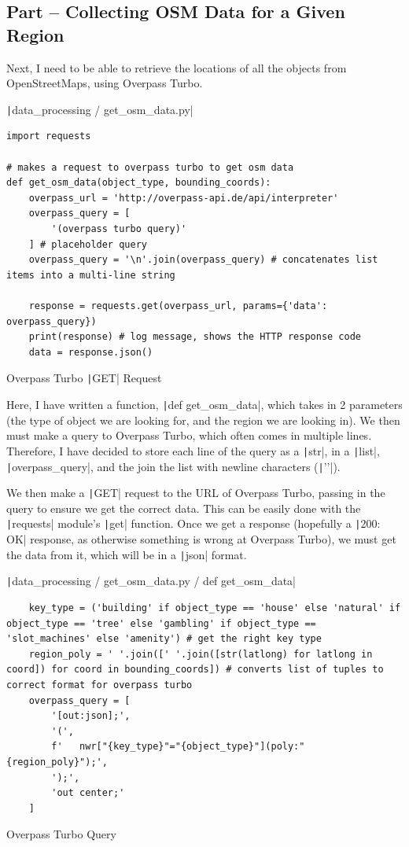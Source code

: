 \documentclass[12pt]{report}
\newcommand{\pil}[1]{\protect\texttt|#1|}
\begin{document}
\subsection{Part \theparts{} -- Collecting OSM Data for a Given Region}\label{sec:get_osm_data}
Next, I need to be able to retrieve the locations of all the objects from OpenStreetMaps, using Overpass Turbo.

\begin{listing}[H]
\pil{data_processing / get_osm_data.py}
\begin{verbatim}
import requests

# makes a request to overpass turbo to get osm data
def get_osm_data(object_type, bounding_coords):
    overpass_url = 'http://overpass-api.de/api/interpreter'
    overpass_query = [
        '(overpass turbo query)'
    ] # placeholder query
    overpass_query = '\n'.join(overpass_query) # concatenates list items into a multi-line string

    response = requests.get(overpass_url, params={'data': overpass_query})
    print(response) # log message, shows the HTTP response code
    data = response.json()
\end{verbatim}
\caption{Overpass Turbo \pil{GET} Request}\label{cs:overpassRequest}
\end{listing}
Here, I have written a function, \pil{def get_osm_data}, which takes in 2 parameters (the type of object we are looking for, and the region we are looking in). We then must make a query to Overpass Turbo, which often comes in multiple lines. Therefore, I have decided to store each line of the query as a \pil{str}, in a \pil{list}, \pil{overpass_query}, and the join the list with newline characters (\texttt|'\n'|).

We then make a \pil{GET} request to the URL of Overpass Turbo, passing in the query to ensure we get the correct data. This can be easily done with the \pil{requests} module's \pil{get} function. Once we get a response (hopefully a \pil{200: OK} response, as otherwise something is wrong at Overpass Turbo), we must get the data from it, which will be in a \pil{json} format.

\begin{listing}[H]
\pil{data_processing / get_osm_data.py / def get_osm_data}
\begin{verbatim}
    key_type = ('building' if object_type == 'house' else 'natural' if object_type == 'tree' else 'gambling' if object_type == 'slot_machines' else 'amenity') # get the right key type
    region_poly = ' '.join([' '.join([str(latlong) for latlong in coord]) for coord in bounding_coords]) # converts list of tuples to correct format for overpass turbo
    overpass_query = [
        '[out:json];',
        '(',
        f'   nwr["{key_type}"="{object_type}"](poly:"{region_poly}");',
        ');',
        'out center;'
    ]
\end{verbatim}
\caption{Overpass Turbo Query}\label{cs:overpassQuery}
\end{listing}
\end{document}

